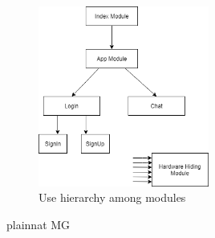 \documentclass[12pt, titlepage]{article}
\begin{document}
\begin{figure}[H]
\centering
\includegraphics[width=0.5\textwidth]{usesHierarchy.png}
\caption{Use hierarchy among modules}
\label{FigUH}
\end{figure}


 {plainnat}
 {MG}
\end{document}
